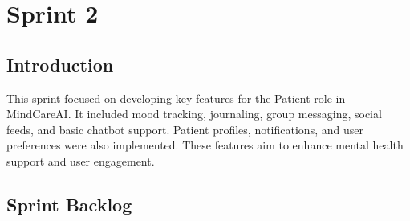 
\section{Sprint 2}
\subsection{Introduction}
This sprint focused on developing key features for the Patient role in MindCareAI.
It included mood tracking, journaling, group messaging, social feeds, and basic chatbot support.
Patient profiles, notifications, and user preferences were also implemented.
These features aim to enhance mental health support and user engagement.

\subsection{Sprint Backlog}
